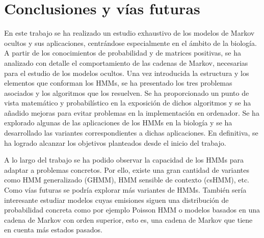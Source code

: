 \chapter*{Conclusiones y vías futuras}

En este trabajo se ha realizado un estudio exhaustivo de los modelos de Markov ocultos y sus aplicaciones, centrándose especialmente en el ámbito de la biología. A partir de los conocimientos de probabilidad y de matrices positivas, se ha analizado con detalle el comportamiento de las cadenas de Markov, necesarias para el estudio de los modelos ocultos. Una vez introducida la estructura y los elementos que conforman los HMMs, se ha presentado los tres problemas asociados y los algoritmos que los resuelven. Se ha proporcionado un punto de vista matemático y probabilístico en la exposición de dichos algoritmos y se ha añadido mejoras para evitar problemas en la implementación en ordenador. Se ha explorado algunas de las aplicaciones de los HMMs en la biología y se ha desarrollado las variantes correspondientes a dichas aplicaciones. En definitiva, se ha logrado alcanzar los objetivos planteados desde el inicio del trabajo.

A lo largo del trabajo se ha podido observar la capacidad de los HMMs para adaptar a problemas concretos. Por ello, existe una gran cantidad de variantes como HMM generalizado (GHMM), HMM sensible de contexto (csHMM), etc. Como vías futuras se podría explorar más variantes de HMMs. También sería interesante estudiar modelos cuyas emisiones siguen una distribución de probabilidad concreta como por ejemplo Poisson HMM o modelos basados en una cadena de Markov con orden superior, esto es, una cadena de Markov que tiene en cuenta más estados pasados.